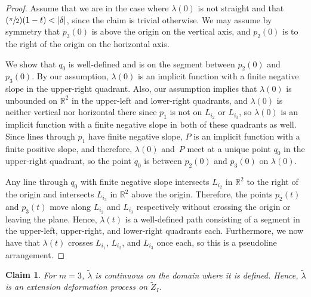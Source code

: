 \documentclass[JEP,XML,SOM,Unicode,NoFloatCountersInSection,published]{cedram}
\let\nicefrac\sfrac
\newtheorem{claim}[theorem]{Claim}
\theoremstyle{remark}
\let\mb\mathbb
\begin{document}
\begin{proof}
Assume that we are in the case where $\lambda(0)$ is not straight and that \hbox{$(\nicefrac{\pi}{2})(1-t) < |\delta|$}, since the claim is trivial otherwise.
We may assume by symmetry that $p_3(0)$ is above the origin on the vertical axis, and $p_2(0)$ is to the right of the origin on the horizontal axis.

We show that $q_0$ is well-defined and is on the segment between $p_2(0)$ and $p_3(0)$.
By our assumption, $\lambda(0)$ is an implicit function with a finite negative slope in the upper-right quadrant.
Also, our assumption implies that $\lambda(0)$ is unbounded on $\mb{R}^2$ in the upper-left and lower-right quadrants, and $\lambda(0)$ is neither vertical nor horizontal there since $p_1$ is not on $L_{i_2}$ or $L_{i_3}$, so $\lambda(0)$ is an implicit function with a finite negative slope in both of these quadrants as well.
Since lines through $p_1$ have finite negative slope, $P$ is an implicit function with a finite positive slope, and therefore, $\lambda(0)$ and~$P$ meet at a unique point $q_0$ in the upper-right quadrant, so the point $q_0$ is between $p_2(0)$ and $p_3(0)$ on $\lambda(0)$.

Any line through $q_0$ with finite negative slope intersects $L_{i_2}$ in $\mb{R}^2$ to the right of the origin and intersects $L_{i_3}$ in $\mb{R}^2$ above the origin.
Therefore, the points $p_2(t)$ and $p_3(t)$ move along $L_{i_2}$ and $L_{i_3}$ respectively without crossing the origin or leaving the plane.
Hence, $\lambda(t)$ is a well-defined path consisting of a segment in the upper-left, upper-right, and lower-right quadrants each.
Furthermore, we now have that $\lambda(t)$ crosses $L_{i_1}$, $L_{i_2}$, and $L_{i_3}$ once each, so this is a pseudoline arrangement.
\end{proof}

\begin{claim}\label{claim-lambda-continuous-3}
For $m =3$, $\tilde \lambda$ is continuous on the domain where it is defined. Hence, $\tilde \lambda$ is an extension deformation process on $\tilde Z_I$.
\end{claim}
\end{document}
